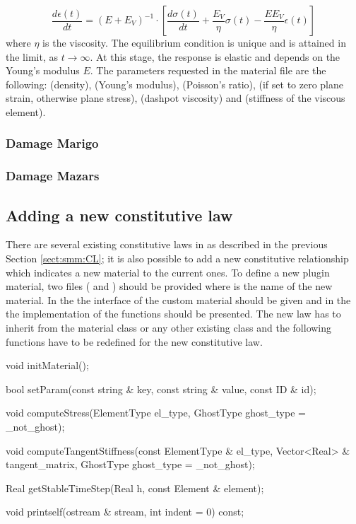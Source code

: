 \begin{equation}
  \frac{d\epsilon(t)}{dt} = \left ( E + E_V \right ) ^ {-1} \cdot \left [ \frac{d\sigma(t)}{dt} + \frac{E_V}{\eta}\sigma(t) - \frac{EE_V}{\eta}\epsilon(t) \right ]
\end{equation}
where $\eta$ is the viscosity. The equilibrium condition is unique and is attained in the limit, as $t \to \infty $. At this stage, the response is elastic and depends on the Young's modulus $E$.
The parameters requested in the material file are the following:  (density),  (Young's modulus),  (Poisson's ratio),  (if set to zero plane strain, otherwise plane stress),  (dashpot viscosity) and  (stiffness of the viscous element).

\subsubsection{Damage Marigo}
\subsubsection{Damage Mazars}

\subsection{Adding a new constitutive law}


There are  several existing constitutive laws in  \akantu as described
in the  previous Section \ref{sect:smm:CL};  it is also  possible to
add a new constitutive relationship which indicates a new material to the
current ones. To define a new plugin material, two files ( and
) should be provided where  is the name of
the new material. In the  the interface of the custom material
should be given and in the  the implementation of
the functions should be presented.  The new law has to inherit from
the material class or any other existing  class and the
following functions have to be redefined for the new constitutive law.


\begin{cpp}
  void initMaterial();

  bool setParam(const string & key, const string & value,
  const ID & id);

  void computeStress(ElementType el_type, GhostType ghost_type = _not_ghost);

  void computeTangentStiffness(const ElementType & el_type,
  Vector<Real> & tangent_matrix,
  GhostType ghost_type = _not_ghost);

  Real getStableTimeStep(Real h, const Element & element);

  void printself(ostream & stream, int indent = 0) const;
\end{cpp}


